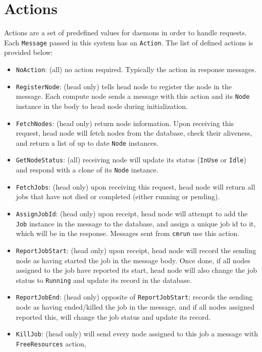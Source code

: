 \documentclass[sigconf]{acmart}
\begin{document}
\section{Actions}
\label{supp:actions}
Actions are a set of predefined values for daemons in order to handle requests. Each \verb|Message| passed in this system has an
\verb|Action|.
The list of defined actions is provided below:

\begin{itemize}
    \item \verb|NoAction|: (all) no action required. Typically the action in response messages.
    \item \verb|RegisterNode|: (head only) tells head node to register the node in the message. Each compute node sends a message with this
        action and its \verb|Node| instance in the body to head node during initialization.
    \item \verb|FetchNodes|: (head only) return node information. Upon receiving this request, head node will fetch nodes from
        the database, check their aliveness, and return a list of up to date \verb|Node| instances.
    \item \verb|GetNodeStatus|: (all) receiving node will update its status (\verb|InUse| or \verb|Idle|) and respond with a clone of
        its \verb|Node| instance.
    \item \verb|FetchJobs|: (head only) upon receiving this request, head node will return all jobs that have not died or
        completed (either running or pending).
    \item \verb|AssignJobId|: (head only) upon receipt, head node will attempt to add the \verb|Job| instance in the message to
        the database, and assign a unique job id to it, which will be in the response. Messages sent from \verb|cmrun| use this
        action.
    \item \verb|ReportJobStart|: (head only) upon receipt, head node will record the sending node as having started the job in
        the message body. Once done, if all nodes assigned to the job have reported its start, head node will also change the
        job status to \verb|Running| and update its record in the database.
    \item \verb|ReportJobEnd|: (head only) opposite of \verb|ReportJobStart|; records the sending node as having
        ended/killed the job in the message, and if all nodes assigned reported this, will change the job status and update its
        record.
    \item \verb|KillJob|: (head only) will send every node assigned to this job a message with \verb|FreeResources| action,

\end{itemize}
\end{document}
